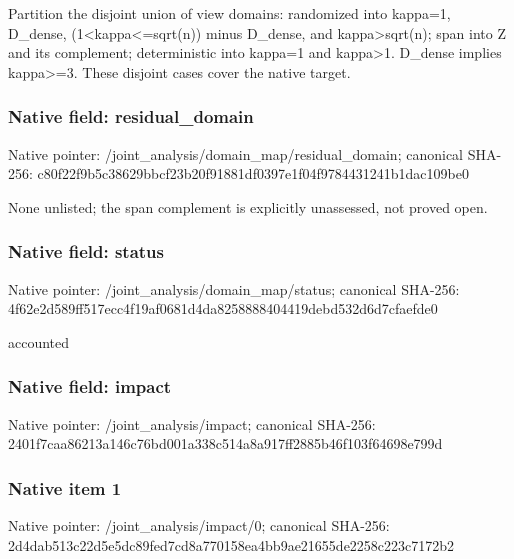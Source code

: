 \documentclass[10pt,a4paper]{article}
\begin{document}
\begingroup\raggedright\sloppy Partition the disjoint union of view domains:\allowbreak{} randomized into kappa=\allowbreak{}1,\allowbreak{} D\_\allowbreak{}dense,\allowbreak{} (1<kappa<=\allowbreak{}sqrt(n)) minus D\_\allowbreak{}dense,\allowbreak{} and kappa>sqrt(n);\allowbreak{} span into Z and its complement;\allowbreak{} deterministic into kappa=\allowbreak{}1 and kappa>1. D\_\allowbreak{}dense implies kappa>=\allowbreak{}3. These disjoint cases cover the native target.\par\endgroup

\subsubsection{Native field: residual\_\allowbreak{}domain}
Native pointer: /joint\_\allowbreak{}analysis/domain\_\allowbreak{}map/residual\_\allowbreak{}domain; canonical SHA-256: c80f22f9b5c38629bbcf23b20f91881df0397e1f04f9784431241b1dac109be0

\begingroup\raggedright\sloppy None unlisted;\allowbreak{} the span complement is explicitly unassessed,\allowbreak{} not proved open.\par\endgroup

\subsubsection{Native field: status}
Native pointer: /joint\_\allowbreak{}analysis/domain\_\allowbreak{}map/status; canonical SHA-256: 4f62e2d589ff517ecc4f19af0681d4da8258888404419debd532d6d7cfaefde0

\begingroup\raggedright\sloppy accounted\par\endgroup

\subsubsection{Native field: impact}
Native pointer: /joint\_\allowbreak{}analysis/impact; canonical SHA-256: 2401f7caa86213a146c76bd001a338c514a8a917ff2885b46f103f64698e799d

\subsubsection{Native item 1}
Native pointer: /joint\_\allowbreak{}analysis/impact/0; canonical SHA-256: 2d4dab513c22d5e5dc89fed7cd8a770158ea4bb9ae21655de2258c223c7172b2
\end{document}

